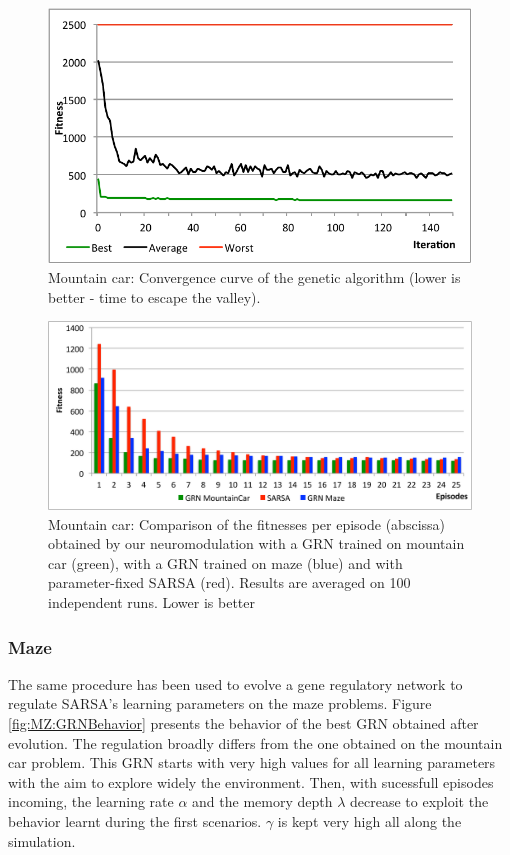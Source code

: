 \begin{figure}[h]
\center
\includegraphics[width=0.75\linewidth]{MC_convergence.pdf}
\caption{Mountain car: Convergence curve of the genetic algorithm (lower is better - time to escape the valley).}\label{fig:MC:Convergence}
\end{figure}

\begin{figure}[h]
\center
\includegraphics[width=\linewidth]{MC_GRNvsSARSA.pdf}
\caption{Mountain car: Comparison of the fitnesses per episode (abscissa) obtained by our neuromodulation with a GRN trained on mountain car (green), with a GRN trained on maze (blue) and with parameter-fixed SARSA (red). Results are averaged on 100 independent runs. Lower is better}\label{fig:MC:GRNvsSARSA}
\end{figure}

\subsubsection{Maze}
The same procedure has been used to evolve a gene regulatory network to regulate SARSA's learning parameters on the maze problems. Figure \ref{fig:MZ:GRNBehavior} presents the behavior of the best GRN obtained after evolution. The regulation broadly differs from the one obtained on the mountain car problem. This GRN starts with very high values for all learning parameters with the aim to explore widely the environment. Then, with sucessfull episodes incoming, the learning rate $\alpha$ and the memory depth $\lambda$ decrease to exploit the behavior learnt during the first scenarios. $\gamma$ is kept very high all along the simulation.

